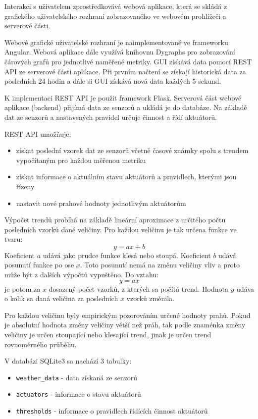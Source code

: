 \documentclass[11pt,a4paper]{article}
\begin{document}
Interakci s uživatelem zprostředkovává webová aplikace, která se skládá z grafického uživatelského rozhraní zobrazovaného ve webovém prohlížeči a serverové části.

Webové grafické uživatelské rozhraní je naimplementované ve frameworku Angular. Webová aplikace dále využívá knihovnu Dygraphs pro zobrazování čárových grafů pro jednotlivé naměřené metriky. GUI získává data pomocí REST API ze serverové části aplikace. Při prvním načtení se získají historická data za posledních 24 hodin a dále si GUI získává nová data každých 5 sekund.

K implementaci REST API je použit framework Flask.
Serverová část webové aplikace (backend) přijímá data ze senzorů a ukládá je do databáze.
Na základě dat ze senzorů a nastavených pravidel určuje činnost a řídí aktuátorů.

REST API umožňuje:
\begin{itemize}
    \item získat poslední vzorek dat ze senzorů včetně časové známky spolu s trendem vypočítaným pro každou měřenou metriku
    \item získat informace o aktuálním stavu aktuátorů a pravidlech, kterými jsou řízeny
    \item nastavit nové prahové hodnoty jednotlivým aktuátorům
\end{itemize}

Výpočet trendů probíhá na základě lineární aproximace z určitého počtu posledních vzorků dané veličiny.
Pro každou veličinu je tak určena funkce ve tvaru:
\[
    y = a x + b
\]
Koeficient $a$ udává jako prudce funkce klesá nebo stoupá.
Koeficient $b$ udává posunutí funkce po ose $x$.
Toto posunutí nemá na změnu veličiny vliv a proto může být z dalších výpočtů vypuštěno.
Do vztahu:
\[
    y = a x
\]
je potom za $x$ dosazený počet vzorků, z kterých sa počítá trend.
Hodnota $y$ udáva o kolik sa daná veličina za posledních $x$ vzorků změnila.

Pro každou veličinu byly empirickým pozorováním určené hodnoty prahů.
Pokud je absolutní hodnota změny veličiny větší než práh, tak podle znaménka změny veličiny je určen stoupající nebo klesající trend, jinak je určen trend rovnoměrného průběhu.

V databázi SQLite3 sa nachází 3 tabulky:
\begin{itemize}
    \item \texttt{weather\_data} - data získaná ze senzorů
    \item \texttt{actuators} - informace o stavu aktuátorů
    \item \texttt{thresholds} - informace o pravidlech řídících činnost aktuátorů
\end{itemize}
\end{document}

